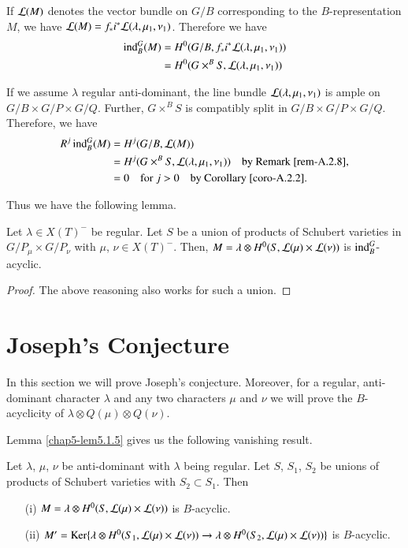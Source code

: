 If $\mathcal{L}(M)$ denotes the vector bundle on $G/B$ corresponding to the
$B$-representation $M$, we have
$\mathcal{L}(M)=f_{\ast}i^{*}\mathcal{L}(\lambda,\mu_{1},\nu_{1})$. Therefore we have
\begin{align*}
\operatorname{ind}^{G}_{B}(M) &=
H^{0}(G/B,f_{\ast}i^{\ast}\mathcal{L}(\lambda,\mu_{1},\nu_{1}))\\
&= H^{0}(G\times^{B}S,\mathcal{L}(\lambda,\mu_{1},\nu_{1}))
\end{align*}

If we assume $\lambda$ regular anti-dominant, the line bundle
$\mathcal{L}(\lambda,\mu_{1},\nu_{1})$ is ample on $G/B\times G/P\times
G/Q$. Further, $G\times^{B}S$ is compatibly split in $G/B\times
G/P\times G/Q$. Therefore, we have
\begin{align*}
R^{j}\operatorname{ind}^{G}_{B}(M) &= H^{j}(G/B,\mathcal{L}(M))\\
&= H^{j}(G\times^{B}S,\mathcal{L}(\lambda,\mu_{1},\nu_{1}))\quad\text{by Remark
  \ref{rem-A.2.8},}\\
&=0\quad \text{for~ } j>0\quad \text{by Corollary \ref{coro-A.2.2}.}
\end{align*}

Thus we have the following lemma.

\begin{lemma}\label{chap5-lem5.1.5}
Let\pageoriginale 
$\lambda\in X(T)^{-}$\label{page51} be regular. Let $S$ be a union of products
of Schubert varieties in $G/P_{\mu}\times G/P_{\nu}$ with $\mu$,
$\nu\in X(T)^{-}$. Then, $M=\lambda\otimes H^{0}(S,\mathcal{L}(\mu)\times
\mathcal{L}(\nu))$ is $\operatorname{ind}^{G}_{B}$-acyclic.
\end{lemma}

\begin{proof}
The above reasoning also works for such a union.
\end{proof}

\section{Joseph's Conjecture}\label{chap5-sec5.2}

In this section we will prove Joseph's conjecture. Moreover, for a
regular, anti-dominant character $\lambda$ and any two characters
$\mu$ and $\nu$ we will prove the $B$-acyclicity of $\lambda\otimes
Q(\mu)\otimes Q(\nu)$.

Lemma \ref{chap5-lem5.1.5} gives us the following vanishing result.

\begin{lemma}\label{chap5-lem5.2.1}
Let $\lambda$, $\mu$, $\nu$ be anti-dominant with $\lambda$ being
regular. Let $S$, $S_{1}$, $S_{2}$ be unions of products of Schubert
varieties with $S_{2}\subset S_{1}$. Then
\begin{itemize}
\item[\rm(i)] $M=\lambda\otimes H^{0}(S,\mathcal{L}(\mu)\times \mathcal{L}(\nu))$ is
  $B$-acyclic.

\item[\rm(ii)] $M'=\operatorname{Ker}\{\lambda\otimes H^{0}(S_{1},\mathcal{L}(\mu)\times
  \mathcal{L}(\nu))\to \lambda\otimes H^{0}(S_{2},\mathcal{L}(\mu)\times \mathcal{L}(\nu))\}$ is
  $B$-acyclic. 
\end{itemize}
\end{lemma}

